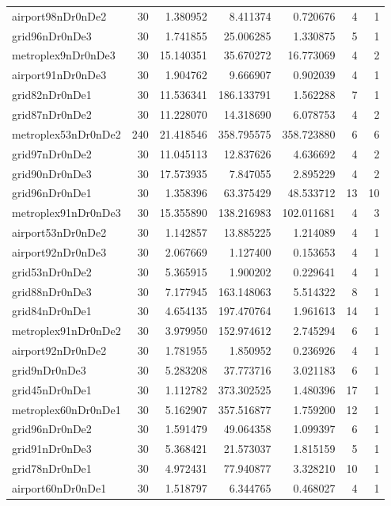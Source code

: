 \begin{longtable}{|l|r|r|r|r|r|r|}
airport98nDr0nDe2 & 30 & 1.380952 & 8.411374 & 0.720676 & 4 & 1 \\
grid96nDr0nDe3 & 30 & 1.741855 & 25.006285 & 1.330875 & 5 & 1 \\
metroplex9nDr0nDe3 & 30 & 15.140351 & 35.670272 & 16.773069 & 4 & 2 \\
airport91nDr0nDe3 & 30 & 1.904762 & 9.666907 & 0.902039 & 4 & 1 \\
grid82nDr0nDe1 & 30 & 11.536341 & 186.133791 & 1.562288 & 7 & 1 \\
grid87nDr0nDe2 & 30 & 11.228070 & 14.318690 & 6.078753 & 4 & 2 \\
metroplex53nDr0nDe2 & 240 & 21.418546 & 358.795575 & 358.723880 & 6 & 6 \\
grid97nDr0nDe2 & 30 & 11.045113 & 12.837626 & 4.636692 & 4 & 2 \\
grid90nDr0nDe3 & 30 & 17.573935 & 7.847055 & 2.895229 & 4 & 2 \\
grid96nDr0nDe1 & 30 & 1.358396 & 63.375429 & 48.533712 & 13 & 10 \\
metroplex91nDr0nDe3 & 30 & 15.355890 & 138.216983 & 102.011681 & 4 & 3 \\
airport53nDr0nDe2 & 30 & 1.142857 & 13.885225 & 1.214089 & 4 & 1 \\
airport92nDr0nDe3 & 30 & 2.067669 & 1.127400 & 0.153653 & 4 & 1 \\
grid53nDr0nDe2 & 30 & 5.365915 & 1.900202 & 0.229641 & 4 & 1 \\
grid88nDr0nDe3 & 30 & 7.177945 & 163.148063 & 5.514322 & 8 & 1 \\
grid84nDr0nDe1 & 30 & 4.654135 & 197.470764 & 1.961613 & 14 & 1 \\
metroplex91nDr0nDe2 & 30 & 3.979950 & 152.974612 & 2.745294 & 6 & 1 \\
airport92nDr0nDe2 & 30 & 1.781955 & 1.850952 & 0.236926 & 4 & 1 \\
grid9nDr0nDe3 & 30 & 5.283208 & 37.773716 & 3.021183 & 6 & 1 \\
grid45nDr0nDe1 & 30 & 1.112782 & 373.302525 & 1.480396 & 17 & 1 \\
metroplex60nDr0nDe1 & 30 & 5.162907 & 357.516877 & 1.759200 & 12 & 1 \\
grid96nDr0nDe2 & 30 & 1.591479 & 49.064358 & 1.099397 & 6 & 1 \\
grid91nDr0nDe3 & 30 & 5.368421 & 21.573037 & 1.815159 & 5 & 1 \\
grid78nDr0nDe1 & 30 & 4.972431 & 77.940877 & 3.328210 & 10 & 1 \\
airport60nDr0nDe1 & 30 & 1.518797 & 6.344765 & 0.468027 & 4 & 1 \\

\end{longtable}
